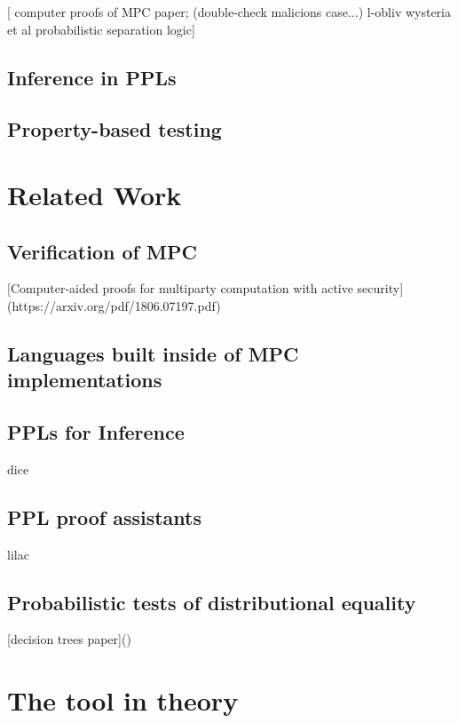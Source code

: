 \documentclass[conference]{IEEEtran}
\begin{document}
[ computer proofs of MPC paper; (double-check malicions case...)
  l-obliv
  wysteria et al
  probabilistic separation logic]

\subsection{Inference in PPLs}

\subsection{Property-based testing}


\section{Related Work}

\subsection{Verification of MPC}

[Computer-aided proofs for multiparty computation with active security](https://arxiv.org/pdf/1806.07197.pdf)

\subsection{Languages built inside of MPC implementations}

\subsection{PPLs for Inference}

dice

\subsection{PPL proof assistants}

lilac

\subsection{Probabilistic tests of distributional equality}

[decision trees paper]()

\section{The tool in theory}
\end{document}
